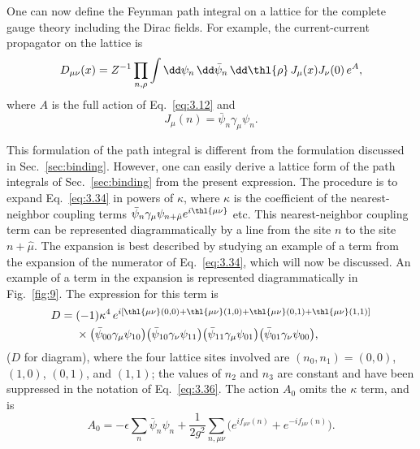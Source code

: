 One can now define the Feynman path integral on a lattice for the
complete gauge theory including the Dirac fields.  For example, the
current-current propagator on the lattice is
\begin{equation}
D_{\mu\nu}(x) = Z^{-1}\prod_{n,\rho}\int\dd\psi_{n}\,\dd\bar\psi_{n}\,
  \dd\thl{\rho}\,J_{\mu}(x)J_{\nu}(0)\,e^{A},
\label{eq:3.34}
\end{equation}
where $A$ is the full action of Eq.~\eqref{eq:3.12} and
\begin{equation}
J_{\mu}(n) = \bar\psi_{n}\gamma_{\mu}\psi_{n}.
\label{eq:3.35}
\end{equation}

This formulation of the path integral is different from the formulation
discussed in Sec.~\ref{sec:binding}.  However, one can easily derive a
lattice form of the path integrals of Sec.~\ref{sec:binding} from the
present expression.  The procedure is to expand
Eq.~\eqref{eq:3.34} in powers of $\kappa$, where $\kappa$ is the
coefficient of the nearest-neighbor coupling terms
$\bar\psi_{n}\gamma_{\mu}\psi_{n+\hat\mu}e^{i\thl{\mu\nu}}$ etc.  This
nearest-neighbor coupling term can be represented diagrammatically by a
line from the site $n$ to the site $n+\hat\mu$.  The expansion is best
described by studying an example of a term from the expansion of the
numerator of Eq.~\eqref{eq:3.34}, which will now be discussed.  An
example of a term in the expansion is represented diagrammatically in
Fig.~\ref{fig:9}.  The expression for this term is
\begin{equation}
\begin{split}
D = {} & (-1)\kappa^{4}\,
    e^{i[\thl{\mu\nu}(0,0)+\thl{\mu\nu}(1,0)+\thl{\mu\nu}(0,1)+\thl{\mu\nu}(1,1)]}\\
      & \times \bigl(\bar\psi_{00}\gamma_{\mu}\psi_{10}\bigr)
        \bigl(\bar\psi_{10}\gamma_{\nu}\psi_{11}\bigr)
        \bigl(\bar\psi_{11}\gamma_{\mu}\psi_{01}\bigr)
        \bigl(\bar\psi_{01}\gamma_{\nu}\psi_{00}\bigr),
\end{split}
\label{eq:3.36}
\end{equation}
($D$ for diagram), where the four lattice sites involved are
$(n_{0},n_{1}) = (0,0)$, $(1,0)$, $(0,1)$, and $(1,1)$; the values of
$n_{2}$ and $n_{3}$ are constant and have been suppressed in the notation
of Eq.~\eqref{eq:3.36}.  The action $A_{0}$ omits the $\kappa$ term, and
is
\begin{equation}
A_{0} = -\epsilon\sum_{n}\bar\psi_{n}\psi_{n}
  + \frac{1}{2g^{2}}\sum_{n,\mu\nu}
    \bigl(e^{if_{\mu\nu}(n)}+e^{-if_{\mu\nu}(n)}\bigr).
\label{eq:3.37}
\end{equation}

